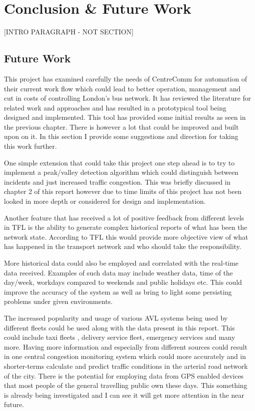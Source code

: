 \chapter{Conclusion \& Future Work}
[INTRO PARAGRAPH - NOT SECTION]

\section{Future Work}
This project has examined carefully the needs of CentreComm for automation of their current work flow which could lead to better operation, management and cut in costs of controlling London's bus network. It has reviewed the literature for related work and approaches and has resulted in a prototypical tool being designed and implemented. This tool has provided some initial results as seen in the previous chapter. There is however a lot that could be improved and built upon on it. In this section I provide some suggestions and direction for taking this work further.

One simple extension that could take this project one step ahead is to try to implement a peak/valley detection algorithm which could distinguish between incidents and just increased traffic congestion. This was briefly discussed in chapter 2 of this report however due to time limits of this project has not been looked in more depth or considered for design and implementation.

Another feature that has received a lot of positive feedback from different levels in TFL is the ability to generate complex historical reports of what has been the network state. According to TFL this would provide more objective view of what has happened in the transport network and who should take the responsibility. 

More historical data could also be employed and correlated with the real-time data received. Examples of such data may include weather data, time of the day/week, workdays compared to weekends and public holidays etc. This could improve the accuracy of the system as well as bring to light some persisting problems under given environments.

The increased popularity and usage of various AVL systems being used by different fleets could be used along with the data present in this report. This could include taxi fleets \cite{rahmani2010requirements}, delivery service fleet, emergency services and many more. Having more information and especially from different sources could result in one central congestion monitoring system which could more accurately and in shorter-terms calculate and predict traffic conditions in the arterial road network of the city. There is the potential for employing data from GPS enabled devices that most people of the general travelling public own these days. This something is already being investigated \cite{thiagarajan2010cooperative} and I can see it will get more attention in the near future.

